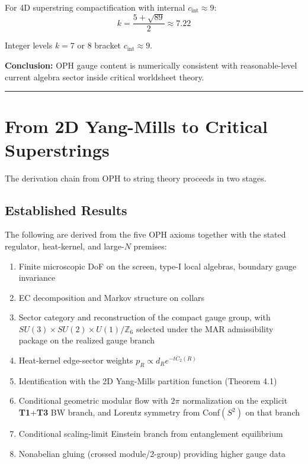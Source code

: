 For 4D superstring compactification with internal \(c_{\text{int}} \approx 9\): \[k = \frac{5 + \sqrt{89}}{2} \approx 7.22\]

Integer levels \(k = 7\) or \(8\) bracket \(c_{\text{int}} \approx 9\).

\textbf{Conclusion:} OPH gauge content is numerically consistent with reasonable-level current algebra sector inside critical worldsheet theory.

\begin{center}\rule{0.5\linewidth}{0.5pt}\end{center}

\section{From 2D Yang-Mills to Critical Superstrings}\label{9-from-2d-yang-mills-to-critical-superstrings}

The derivation chain from OPH to string theory proceeds in two stages.

\subsection{Established Results}\label{91-established-results}

The following are derived from the five OPH axioms together with the stated regulator, heat-kernel, and large-\(N\) premises:

\begin{enumerate}
\def\labelenumi{\arabic{enumi}.}
\tightlist
\item
  Finite microscopic DoF on the screen, type-I local algebras, boundary gauge invariance
\item
  EC decomposition and Markov structure on collars
\item
  Sector category and reconstruction of the compact gauge group, with \(SU(3) \times SU(2) \times U(1)/\mathbb{Z}_6\) selected under the MAR admissibility package on the realized gauge branch
\item
  Heat-kernel edge-sector weights \(p_R \propto d_R e^{-t C_2(R)}\)
\item
  Identification with the 2D Yang-Mills partition function (Theorem 4.1)
\item
  Conditional geometric modular flow with \(2\pi\) normalization on the explicit \textbf{T1}+\textbf{T3} BW branch, and Lorentz symmetry from Conf\((S^2)\) on that branch
\item
  Conditional scaling-limit Einstein branch from entanglement equilibrium
\item
  Nonabelian gluing (crossed module/2-group) providing higher gauge data
\end{enumerate}

